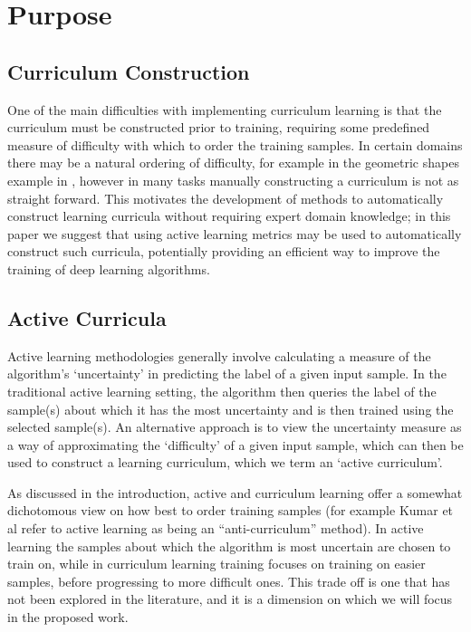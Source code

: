 \documentclass[a4paper,10.5pt]{article}
\begin{document}
\section{Purpose}
\subsection*{Curriculum Construction}
One of the main difficulties with implementing curriculum learning is that the curriculum must be constructed prior to training, requiring some predefined measure of difficulty with which to order the training samples. In certain domains  there may be a natural ordering of difficulty, for example in the geometric shapes example in \cite{Bengio 09}, however in many tasks manually constructing a curriculum is not as straight forward. This motivates the development of methods to automatically construct learning curricula without requiring expert domain knowledge; in this paper we suggest that using active learning metrics may be used to automatically construct such curricula, potentially providing an efficient way to improve the training of deep learning algorithms.

\subsection*{Active Curricula}
Active learning methodologies generally involve calculating a measure of the algorithm's `uncertainty' in predicting the label of a given input sample. In the traditional active learning setting, the algorithm then queries the label of the sample(s) about which it has the most uncertainty and is then trained using the selected sample(s). An alternative approach is to view the uncertainty measure as a way of approximating the `difficulty' of a given input sample, which can then be used to construct a learning curriculum, which we term an `active curriculum'.

As discussed in the introduction, active and curriculum learning offer a somewhat dichotomous view on how best to order training samples (for example Kumar et al \cite{Koller 2010} refer to active learning as being an ``anti-curriculum'' method). In active learning the samples about which the algorithm is most uncertain are chosen to train on, while in curriculum learning training focuses on training on easier samples, before progressing to more difficult ones. This trade off is one that has not been explored in the literature, and it is a dimension on which we will focus in the proposed work. 
\end{document}
